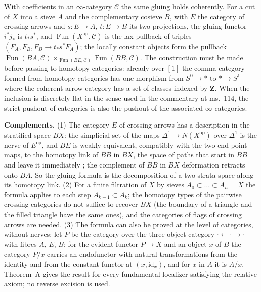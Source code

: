 With coefficients in an $\infty$-category $\mathcal C$ the same gluing holds coherently. For a cut of $X$ into a sieve $A$ and the complementary cosieve $B$, with $E$ the category of crossing arrows and $s:E\to A$, $t:E\to B$ its two projections, the gluing functor $i^*j_*$ is $t_*s^*$, and $\operatorname{Fun}(X^{\mathrm{op}},\mathcal C)$ is the lax pullback of triples $(F_A,F_B,F_B\to t_*s^*F_A)$; the locally constant objects form the pullback $\operatorname{Fun}(BA,\mathcal C)\times_{\operatorname{Fun}(BE,\mathcal C)}\operatorname{Fun}(BB,\mathcal C)$. The construction must be made before passing to homotopy categories: already over $[1]$ the comma category formed from homotopy categories has one morphism from $S^0\to*$ to $*\to S^1$ where the coherent arrow category has a set of classes indexed by $\mathbf Z$. When the inclusion is discretely flat in the sense used in the commentary at ms.~114, the strict pushout of categories is also the pushout of the associated $\infty$-categories.

\textbf{Complements.}
(1) The category $E$ of crossing arrows has a description in the stratified space $BX$: the simplicial set of the maps $\Delta^1\to N(X^{\mathrm{op}})$ over $\Delta^1$ is the nerve of $E^{\mathrm{op}}$, and $BE$ is weakly equivalent, compatibly with the two end-point maps, to the homotopy link of $BB$ in $BX$, the space of paths that start in $BB$ and leave it immediately \citep[Theorem~6.1]{CDDouteauWaas2022}; the complement of $BB$ in $BX$ deformation retracts onto $BA$. So the gluing formula is the decomposition of a two-strata space along its homotopy link.
(2) For a finite filtration of $X$ by sieves $A_0\subset\dots\subset A_n=X$ the formula applies to each step $A_{k-1}\subset A_k$; the homotopy types of the pairwise crossing categories do not suffice to recover $BX$ (the boundary of a triangle and the filled triangle have the same ones), and the categories of flags of crossing arrows are needed.
(3) The formula can also be proved at the level of categories, without nerves: let $P$ be the category over the three-object category $\cdot\leftarrow\cdot\to\cdot$ with fibres $A$, $E$, $B$; for the evident functor $P\to X$ and an object $x$ of $B$ the category $P/x$ carries an endofunctor with natural transformations from the identity and from the constant functor at $(x,\mathrm{id}_x)$, and for $x$ in $A$ it is $A/x$. Theorem~A gives the result for every fundamental localizer satisfying the relative axiom; no reverse excision is used.

